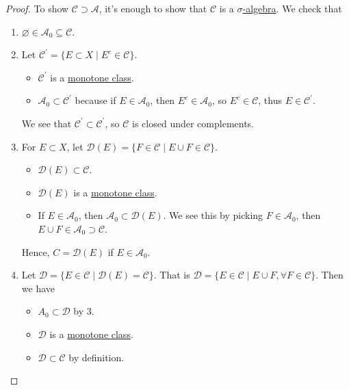 \begin{proof}
	\par To show \(\mathcal{C} \supset \mathcal{A} \), it's enough to show that \(\mathcal{C} \) is a \hyperref[def:sigma-algebra]{\(\sigma\)-algebra}. We
	check that
	\begin{enumerate}
		\item \(\varnothing \in \mathcal{A} _0 \subseteq \mathcal{C} \).
		\item Let \(\mathcal{C} ^\prime = \{E\subset X \mid E^{c} \in \mathcal{C} \}\).
		      \begin{itemize}
			      \item \(\mathcal{C} ^\prime \) is a \hyperref[def:monotone-class]{monotone class}.
			      \item \(\mathcal{A} _0\subset \mathcal{C} ^\prime \) because if \(E\in \mathcal{A} _0\), then \(E^{c} \in \mathcal{A} _0\), so
			            \(E^{c} \in \mathcal{C} \), thus \(E\in \mathcal{C} ^\prime \).
		      \end{itemize}
		      We see that \(\mathcal{C} ^\prime \subset \mathcal{C}^\prime \), so \(\mathcal{C} \) is closed under complements.
		\item For \(E\subset X\), let \(\mathcal{D} (E) = \{F\in \mathcal{C} \mid E \cup F\in \mathcal{C} \}\).
		      \begin{itemize}
			      \item \(\mathcal{D} (E)\subset \mathcal{C} \).
			      \item \(\mathcal{D} (E)\) is a \hyperref[def:monotone-class]{monotone class}.
			      \item If \(E\in \mathcal{A} _0\), then \(\mathcal{A} _0\subset \mathcal{D} (E)\). We see this by picking \(F\in \mathcal{A} _0\), then
			            \(E\cup F\in \mathcal{A} _0\supset \mathcal{C} \).
		      \end{itemize}
		      Hence, \(C = \mathcal{D} (E)\) if \(E\in \mathcal{A} _0\).
		\item Let \(\mathcal{D} = \{E\in \mathcal{C} \mid \mathcal{D} (E) = \mathcal{C} \}\). That is \(\mathcal{D}  = \{E\in \mathcal{C} \mid E\cup F, \forall F\in \mathcal{C} \}\).
		      Then we have
		      \begin{itemize}
			      \item \(A_0\subset \mathcal{D} \) by 3.
			      \item \(\mathcal{D} \) is a \hyperref[def:monotone-class]{monotone class}.
			      \item \(\mathcal{D} \subset \mathcal{C} \) by definition.
		      \end{itemize}

\end{enumerate}
\end{proof}
